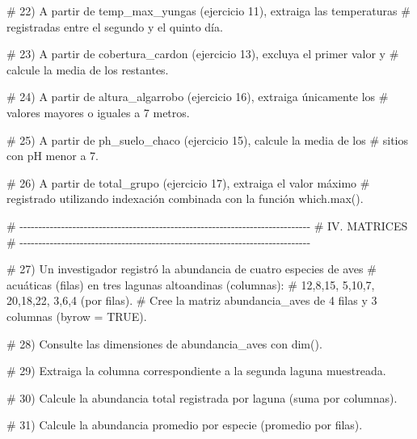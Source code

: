 \documentclass[
  spanish,
  letterpaper,
  DIV=11,
  numbers=noendperiod]{scrreprt}
\newenvironment{Shaded}{\begin{snugshade}}{\end{snugshade}}
\newcommand{\CommentTok}[1]{\textcolor[rgb]{0.37,0.37,0.37}{#1}}
\begin{document}
\begin{Shaded}
\begin{Highlighting}[]
\CommentTok{\# 22) A partir de \textquotesingle{}temp\_max\_yungas\textquotesingle{} (ejercicio 11), extraiga las temperaturas}
\CommentTok{\#     registradas entre el segundo y el quinto día.}


\CommentTok{\# 23) A partir de \textquotesingle{}cobertura\_cardon\textquotesingle{} (ejercicio 13), excluya el primer valor y}
\CommentTok{\#     calcule la media de los restantes.}


\CommentTok{\# 24) A partir de \textquotesingle{}altura\_algarrobo\textquotesingle{} (ejercicio 16), extraiga únicamente los}
\CommentTok{\#     valores mayores o iguales a 7 metros.}


\CommentTok{\# 25) A partir de \textquotesingle{}ph\_suelo\_chaco\textquotesingle{} (ejercicio 15), calcule la media de los}
\CommentTok{\#     sitios con pH menor a 7.}


\CommentTok{\# 26) A partir de \textquotesingle{}total\_grupo\textquotesingle{} (ejercicio 17), extraiga el valor máximo}
\CommentTok{\#     registrado utilizando indexación combinada con la función which.max().}

\CommentTok{\# {-}{-}{-}{-}{-}{-}{-}{-}{-}{-}{-}{-}{-}{-}{-}{-}{-}{-}{-}{-}{-}{-}{-}{-}{-}{-}{-}{-}{-}{-}{-}{-}{-}{-}{-}{-}{-}{-}{-}{-}{-}{-}{-}{-}{-}{-}{-}{-}{-}{-}{-}{-}{-}{-}{-}{-}{-}{-}{-}{-}{-}{-}{-}{-}{-}{-}{-}{-}{-}{-}{-}{-}{-}{-}{-}{-}{-}}
\CommentTok{\# IV. MATRICES}
\CommentTok{\# {-}{-}{-}{-}{-}{-}{-}{-}{-}{-}{-}{-}{-}{-}{-}{-}{-}{-}{-}{-}{-}{-}{-}{-}{-}{-}{-}{-}{-}{-}{-}{-}{-}{-}{-}{-}{-}{-}{-}{-}{-}{-}{-}{-}{-}{-}{-}{-}{-}{-}{-}{-}{-}{-}{-}{-}{-}{-}{-}{-}{-}{-}{-}{-}{-}{-}{-}{-}{-}{-}{-}{-}{-}{-}{-}{-}{-}}

\CommentTok{\# 27) Un investigador registró la abundancia de cuatro especies de aves}
\CommentTok{\#     acuáticas (filas) en tres lagunas altoandinas (columnas): }
\CommentTok{\#     12,8,15, 5,10,7, 20,18,22, 3,6,4 (por filas). }
\CommentTok{\#     Cree la matriz \textquotesingle{}abundancia\_aves\textquotesingle{} de 4 filas y 3 columnas (byrow = TRUE).}


\CommentTok{\# 28) Consulte las dimensiones de \textquotesingle{}abundancia\_aves\textquotesingle{} con dim().}


\CommentTok{\# 29) Extraiga la columna correspondiente a la segunda laguna muestreada.}


\CommentTok{\# 30) Calcule la abundancia total registrada por laguna (suma por columnas).}


\CommentTok{\# 31) Calcule la abundancia promedio por especie (promedio por filas).}



\end{Highlighting}
\end{Shaded}
\end{document}
